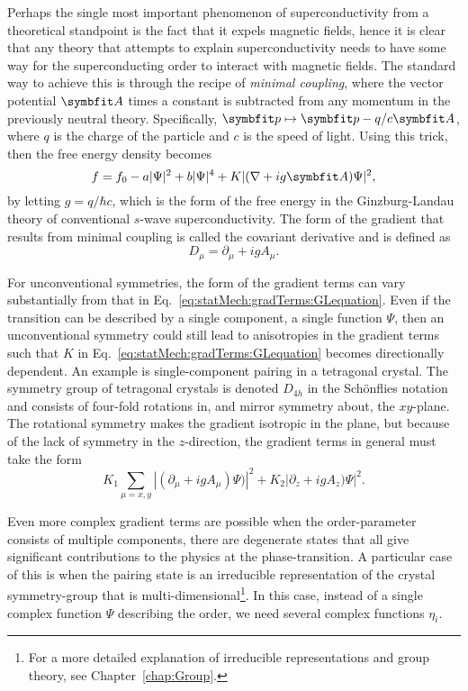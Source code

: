 Perhaps the single most important phenomenon of superconductivity from a theoretical standpoint is the fact that it expels
magnetic fields, hence it is clear that any theory that attempts to explain superconductivity needs to have some way for the
superconducting order to interact with magnetic fields. The standard way to achieve this is through the recipe of
\emph{minimal coupling}, where the vector potential $\v{A}$ times a constant is subtracted from any momentum
in the previously neutral theory. Specifically, $\v{p}\mapsto \v{p}-q/c\v{A}$, where $q$ is the charge of the particle and
$c$ is the speed of light. Using this trick, then the free energy density becomes
\begin{equation}
    \label{eq:statMech:gradTerms:GLequation}
    f = f_0 - a\abs{\Psi}^2 + b\abs{\Psi}^4 + K\abs{(\nabla+ig\v{A})\Psi}^2,
\end{equation}
by letting $g=q/\hbar c$, which is the form of the free energy in the Ginzburg-Landau theory of conventional $s$-wave superconductivity.
The form of the gradient that results from minimal coupling is called the covariant derivative and is defined as 
\begin{equation}
    \label{eq:statMech:gradTerms:covariantGradient}
    D_\mu = \partial_\mu + igA_\mu.
\end{equation}

For unconventional symmetries, the form of the gradient terms can vary substantially from that in
Eq.~\eqref{eq:statMech:gradTerms:GLequation}. Even if the transition can be described by a single component, \ie a
single function $\Psi$, then an unconventional symmetry could still lead to anisotropies in the gradient terms such that
$K$ in Eq.~\eqref{eq:statMech:gradTerms:GLequation} becomes directionally dependent.
An example is single-component pairing in a tetragonal crystal. The symmetry group of tetragonal crystals is denoted $D_{4h}$ in the Sch\"onflies
notation and consists of four-fold rotations in, and mirror symmetry about, the $xy$-plane. The rotational symmetry
makes the gradient isotropic in the plane, but because of the lack of symmetry in the $z$-direction, the gradient
terms in general must take the form
\begin{equation}
    \label{eq:statMech:gradTerms:tetragonal}
    K_1\sum_{\mu=x,y}|(\partial_\mu+igA_\mu)\Psi)|^2 + K_2|\partial_z+igA_z)\Psi|^2.
\end{equation}

Even more complex gradient terms are possible when the order-parameter consists of multiple components, \ie there are degenerate
states that all give significant contributions to the physics at the phase-transition. A particular case of this is when the
pairing state is an irreducible representation of the crystal symmetry-group that is multi-dimensional\footnote{For a more detailed explanation
of irreducible representations and group theory, see Chapter~\ref{chap:Group}.}. In this case, instead of a single complex function $\Psi$
describing the order, we need several complex functions $\eta_i$. 

